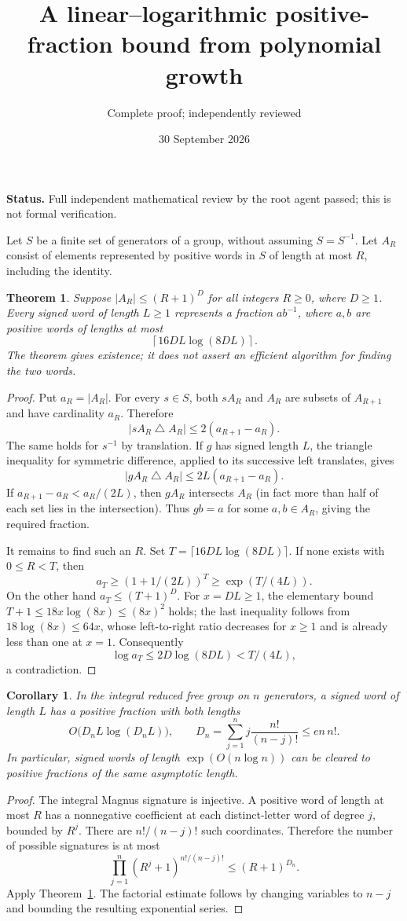 \documentclass[11pt]{article}
\title{A linear--logarithmic positive-fraction bound from polynomial growth}
\author{Complete proof; independently reviewed}
\date{30 September 2026}
\newtheorem{theorem}{Theorem}
\newtheorem{corollary}{Corollary}
\begin{document}
\maketitle
\noindent\textbf{Status.} Full independent mathematical review by the root
agent passed; this is not formal verification.

Let $S$ be a finite set of generators of a group, without assuming
$S=S^{-1}$. Let $A_R$ consist of elements represented by positive words
in $S$ of length at most $R$, including the identity.

\begin{theorem}\label{ore}
Suppose $|A_R|\le(R+1)^D$ for all integers $R\ge0$, where $D\ge1$.
Every signed word of length $L\ge1$ represents a fraction $ab^{-1}$,
where $a,b$ are positive words of lengths at most
\[
 \left\lceil16DL\log(8DL)\right\rceil.
\]
The theorem gives existence; it does not assert an efficient algorithm
for finding the two words.
\end{theorem}
\begin{proof}
Put $a_R=|A_R|$. For every $s\in S$, both $sA_R$ and $A_R$ are
subsets of $A_{R+1}$ and have cardinality $a_R$. Therefore
\[
 |sA_R\mathbin\triangle A_R|\le2(a_{R+1}-a_R).
\]
The same holds for $s^{-1}$ by translation. If $g$ has signed length
$L$, the triangle inequality for symmetric difference, applied to its
successive left translates, gives
\[
 |gA_R\mathbin\triangle A_R|\le2L(a_{R+1}-a_R).
\]
If $a_{R+1}-a_R<a_R/(2L)$, then $gA_R$ intersects $A_R$ (in fact
more than half of each set lies in the intersection). Thus $gb=a$
for some $a,b\in A_R$, giving the required fraction.

It remains to find such an $R$. Set
$T=\lceil16DL\log(8DL)\rceil$. If none exists with $0\le R<T$,
then
\[
 a_T\ge(1+1/(2L))^T\ge\exp(T/(4L)).
\]
On the other hand $a_T\le(T+1)^D$.
For $x=DL\ge1$, the elementary bound
$T+1\le18x\log(8x)\le(8x)^2$ holds; the last inequality follows
from $18\log(8x)\le64x$, whose left-to-right ratio decreases for
$x\ge1$ and is already less than one at $x=1$.
Consequently
\[
 \log a_T\le2D\log(8DL)
 <T/(4L),
\]
a contradiction.
\end{proof}

\begin{corollary}
In the integral reduced free group on $n$ generators, a signed word
of length $L$ has a positive fraction with both lengths
\[
 O\bigl(D_nL\log(D_nL)\bigr),\qquad
 D_n=\sum_{j=1}^n j\frac{n!}{(n-j)!}\le en\,n!.
\]
In particular, signed words of length $\exp(O(n\log n))$ can be
cleared to positive fractions of the same asymptotic length.
\end{corollary}
\begin{proof}
The integral Magnus signature is injective. A positive word of length
at most $R$ has a nonnegative coefficient at each distinct-letter word
of degree $j$, bounded by $R^j$. There are $n!/(n-j)!$ such coordinates.
Therefore the number of possible signatures is at most
\[
 \prod_{j=1}^n(R^j+1)^{n!/(n-j)!}
 \le(R+1)^{D_n}.
\]
Apply Theorem~\ref{ore}. The factorial estimate follows by changing
variables to $n-j$ and bounding the resulting exponential series.
\end{proof}
\end{document}

